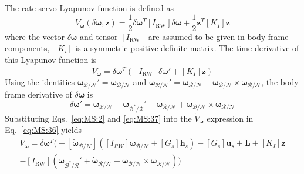 \documentclass[]{BasiliskReportMemo}
\begin{document}
The rate servo Lyapunov function is defined as
\begin{equation}
	\label{eq:MS:35}
	V_{\bm\omega}(\delta\bm\omega, \bm z) = \frac{1}{2} \delta\bm\omega ^{T} [I_{\text{RW}}] \delta\bm\omega + \frac{1}{2} \bm z ^{T} [K_{I}] \bm z
\end{equation}
where the vector $\delta\bm\omega$ and tensor $[I_{\text{RW}}]$ are assumed to be given in body frame components, $[K_{i}]$ is a symmetric positive definite matrix.  The time derivative of this Lyapunov function is
\begin{equation}
	\label{eq:MS:36}
	\dot V_{\bm\omega} = \delta\bm\omega^{T} \left(
		[I_{\text{RW}}] \delta\bm\omega' + [K_{I}] \bm z
	\right)
\end{equation}
Using the identities ${\bm\omega}_{\mathcal{B}/\mathcal{N}}' = \dot{\bm\omega}_{\mathcal{B}/\mathcal{N}}$ and $ \bm\omega_{\mathcal{R}/\mathcal{N}}' =  \dot{\bm\omega}_{\mathcal{R}/\mathcal{N}} -  {\bm\omega}_{\mathcal{B}/\mathcal{N}} \times  \bm\omega_{\mathcal{R}/\mathcal{N}}$,\cite{schaub} the body frame derivative of $\delta \bm\omega$ is
\begin{equation}
	\label{eq:MS:37}
	\delta\bm \omega '= \dot{\bm\omega}_{\mathcal{B}/\mathcal{N}} - \bm\omega_{\mathcal{B}^{\ast}/\mathcal{R}} ' -  \dot{\bm\omega}_{\mathcal{R}/\mathcal{N}} +  {\bm\omega}_{\mathcal{B}/\mathcal{N}} \times  \bm\omega_{\mathcal{R}/\mathcal{N}}
\end{equation}
Substituting Eqs.~\eqref{eq:MS:2} and \eqref{eq:MS:37} into the $\dot V_{\bm\omega}$ expression in Eq.~\eqref{eq:MS:36} yields
\begin{multline}
	\label{eq:MS:38}
	\dot V_{\bm\omega} = \delta\bm\omega^{T} \Big(
		- [\tilde{\bm \omega}_{\mathcal{B}/\mathcal{N}}] \left(
	[I_{RW}] \bm\omega_{\mathcal{B}/\mathcal{N}} + [G_{s}] \bm h_{s}
	\right) - [G_{s}] \bm u_{s} + \bm L + [K_{I}] \bm z
	\\
	- [I_{\text{RW}}](\bm\omega_{\mathcal{B}^{\ast}/\mathcal{R}} ' +  \dot{\bm\omega}_{\mathcal{R}/\mathcal{N}} - {\bm\omega}_{\mathcal{B}/\mathcal{N}} \times  \bm\omega_{\mathcal{R}/\mathcal{N}})
	\Big)
\end{multline}
\end{document}
